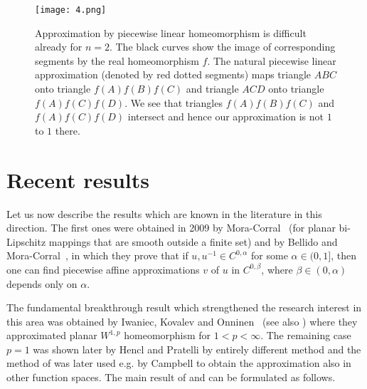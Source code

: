 \documentclass[12pt,a4paper]{amsart}
\theoremstyle{plain}
\theoremstyle{definition}
\numberwithin{equation}{section}
\def\epsilon{\varepsilon}
\def\er{\mathbb R}
\def\eps{\epsilon}
\newcounter{problem}
\begin{document}

    
\begin{figure}
\centering
\vskip -40pt
\texttt{[image: 4.png]}
\vskip -40pt
\caption{Approximation by piecewise linear homeomorphism is difficult already for $n=2$. The black curves show the image of corresponding segments by the real homeomorphism $f$. The natural piecewise linear approximation (denoted by red dotted segments) maps triangle $ABC$ onto triangle $f(A)f(B)f(C)$ and triangle $ACD$ onto triangle $f(A)f(C)f(D)$. We see that triangles $f(A)f(B)f(C)$ and $f(A)f(C)f(D)$ intersect and hence our approximation is not $1$ to $1$ there.}\label{fign2}
\end{figure}  

\section{Recent results}

Let us now describe the results which are known in the literature in this direction. The first ones were obtained in 2009 by Mora-Corral~\cite{M} (for planar bi-Lipschitz mappings that are smooth outside a finite set) and by Bellido and Mora-Corral~\cite{BMC}, in which they prove that if $u, u^{-1}\in C^{0,\alpha}$ for some $\alpha\in (0,1]$, then one can find piecewise affine approximations $v$ of $u$ in $C^{0,\beta}$, where $\beta\in(0,\alpha)$ depends only on $\alpha$.\par

The fundamental breakthrough result which strengthened the research interest in this area was obtained by Iwaniec, Kovalev and Onninen~\cite{IKO} (see also \cite{IKO2}) where they approximated planar $W^{1,p}$ homeomorphism for $1<p<\infty$. 
The remaining case $p=1$ was shown later by Hencl and Pratelli \cite{HP} by entirely different method and the method of \cite{HP} was later used e.g. by Campbell \cite{Ca} to obtain the approximation also in other function spaces. The main result of \cite{IKO2} and \cite{HP} can be formulated as follows. \par 
\end{document}
